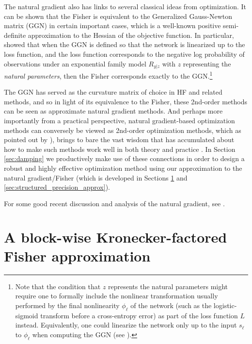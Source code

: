 \documentclass[12pt]{article}
\newcommand{\nonlin}{\phi}
\begin{document}
The natural gradient also has links to several classical ideas from optimization.  It can be shown \citep{ng_martens,Razvan} that the Fisher is equivalent to the Generalized Gauss-Newton matrix (GGN) \citep{schraudolph,HF_chapter} in certain important cases, which is a well-known positive semi-definite approximation to the Hessian of the objective function.  In particular, \citep{ng_martens} showed that when the GGN is defined so that the network is linearized up to the loss function, and the loss function corresponds to the negative log probability of observations under an exponential family model $R_{y|z}$ with $z$ representing the \emph{natural parameters}, then the Fisher corresponds exactly to the GGN.\footnote{Note that the condition that $z$ represents the natural parameters might require one to formally include the nonlinear transformation usually performed by the final nonlinearity $\nonlin_{\ell}$ of the network (such as the logistic-sigmoid transform before a cross-entropy error) as part of the loss function $L$ instead.  Equivalently, one could linearize the network only up to the input $s_\ell$ to $\nonlin_{\ell}$ when computing the GGN (see \citet{HF_chapter}).}

The GGN has served as the curvature matrix of choice in HF and related methods, and so in light of its equivalence to the Fisher, these 2nd-order methods can be seen as approximate natural gradient methods.  And perhaps more importantly from a practical perspective, natural gradient-based optimization methods can conversely be viewed as 2nd-order optimization methods, which as pointed out by \citet{ng_martens}), brings to bare the vast wisdom that has accumulated about how to make such methods work well in both theory and practice \citep[e.g][]{nocedal_book}.  In Section \ref{sec:damping} we productively make use of these connections in order to design a robust and highly effective optimization method using our approximation to the natural gradient/Fisher (which is developed in Sections \ref{sec:kron_approx} and \ref{sec:structured_precision_approx}).

For some good recent discussion and analysis of the natural gradient, see \citet{IGO,ng_martens,Razvan}. 


\section{A block-wise Kronecker-factored Fisher approximation}
\label{sec:kron_approx}
\end{document}
